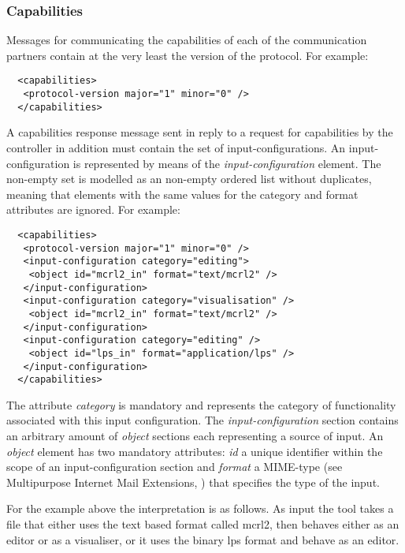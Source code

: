 \documentclass{article}
\begin{document}
  \subsubsection{Capabilities}

   Messages for communicating the capabilities of each of the communication
   partners contain at the very least the version of the protocol. For example:

   \small \begin{verbatim}
  <capabilities>
   <protocol-version major="1" minor="0" />
  </capabilities>\end{verbatim}
  \normalsize

   \noindent A capabilities response message sent in reply to a request for
   capabilities by the controller in addition must contain the set of
   input-configurations. An input-configuration is represented by means of the
   \textit{input-configuration} element. The non-empty set is modelled as an
   non-empty ordered list without duplicates, meaning that elements with the
   same values for the category and format attributes are ignored. For example:

   \small \begin{verbatim}
  <capabilities>
   <protocol-version major="1" minor="0" />
   <input-configuration category="editing">
    <object id="mcrl2_in" format="text/mcrl2" />
   </input-configuration>
   <input-configuration category="visualisation" />
    <object id="mcrl2_in" format="text/mcrl2" />
   </input-configuration>
   <input-configuration category="editing" />
    <object id="lps_in" format="application/lps" />
   </input-configuration>
  </capabilities>\end{verbatim}
  \normalsize

   \noindent The attribute \textit{category} is mandatory and represents the
   category of functionality associated with this input configuration. The
   \textit{input-configuration} section contains an arbitrary amount of
   \textit{object} sections each representing a source of input. An
   \textit{object} element has two mandatory attributes: \textit{id} a unique
   identifier within the scope of an input-configuration section and
   \textit{format} a MIME-type (see Multipurpose Internet Mail Extensions,
   \cite{rfc2822}) that specifies the type of the input.

   For the example above the interpretation is as follows. As input the tool
   takes a file that either uses the text based format called mcrl2, then
   behaves either as an editor or as a visualiser, or it uses the binary lps
   format and behave as an editor.
\end{document}
